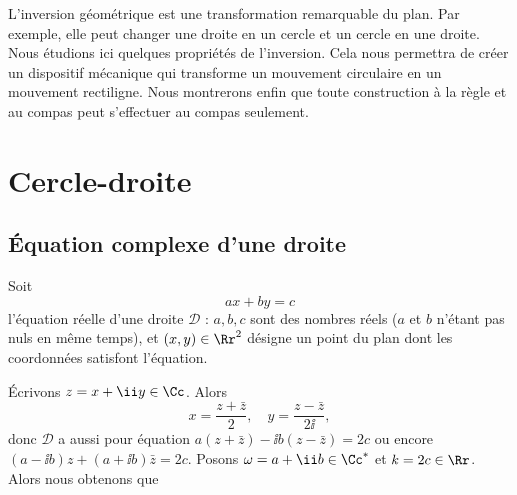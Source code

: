 \documentclass[11pt,class=report,crop=false]{standalone}
\begin{document}
\newcommand{\inversion}{i}
\renewcommand{\vec}[1]{\overrightarrow{#1}}




L'inversion géométrique est une transformation remarquable du plan. Par exemple, elle peut changer une droite en un cercle
et un cercle en une droite. Nous étudions ici quelques propriétés de l'inversion. Cela nous permettra de créer un dispositif mécanique qui transforme un mouvement circulaire en un mouvement rectiligne. Nous montrerons enfin que toute construction à la règle et au compas peut s'effectuer au compas seulement.


\section{Cercle-droite}

\subsection{\'Equation complexe d'une droite}

Soit 
$$ax+by=c$$ 
l'équation réelle d'une droite $\mathcal{D}$ : $a,b,c$ sont des nombres réels
($a$ et $b$ n'étant pas nuls en même temps),
et $(x,y) \in \Rr^2$ désigne un point du plan dont les coordonnées satisfont l'équation.



\'Ecrivons $z=x+\ii y \in \Cc$. Alors 
$$x = \frac{z+\bar z}{2}, \quad y = \frac{z - \bar z}{2\ii},$$
donc $\mathcal{D}$ a aussi pour équation
$a(z+\bar z) -\ii b(z-\bar z)=2c$ ou encore $(a-\ii b)z+(a+\ii b)\bar z = 2c$.
Posons $\omega = a+\ii b \in \Cc^*$ et $k=2c \in \Rr$. Alors nous obtenons que\\

\end{document}
